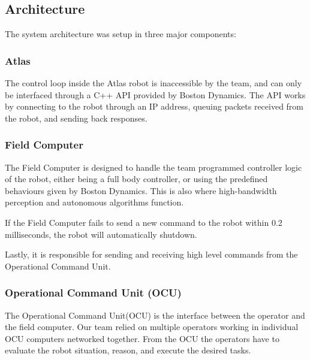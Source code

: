 \documentclass[12pt]{report}
\begin{document}
\subsection{Architecture}

The system architecture was setup in three major components: 

\subsubsection{Atlas}
The control loop inside the Atlas robot is inaccessible by the team, and can only be interfaced through a C++ API provided by Boston Dynamics. The API works by connecting to the robot through an IP address, queuing packets received from the robot, and sending back responses. 

\subsubsection{Field Computer}
The Field Computer is designed to handle the team programmed controller logic of the robot, either being a full body controller, or using the predefined behaviours given by Boston Dynamics. This is also where high-bandwidth perception and autonomous algorithms function.

If the Field Computer fails to send a new command to the robot within 0.2 milliseconds, the robot will automatically shutdown. 

Lastly, it is responsible for sending and receiving high level commands from the Operational Command Unit.

\subsubsection{Operational Command Unit (OCU)}

The Operational Command Unit(OCU) is the interface between the operator and the field computer. Our team relied on multiple operators working in individual OCU computers networked together. From the OCU the operators have to evaluate the robot situation, reason, and execute the desired tasks.


\end{document}
